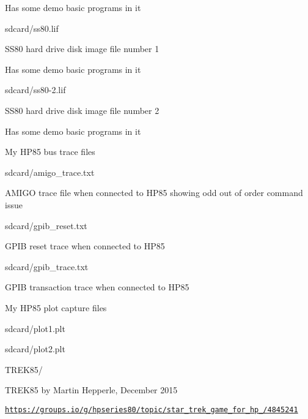 \begin{DoxyItemize}
\begin{DoxyItemize}
\begin{DoxyItemize}
\begin{DoxyItemize}
\item Has some demo basic programs in it
\end{DoxyItemize}
\item sdcard/ss80.\+lif
\begin{DoxyItemize}
\item S\+S80 hard drive disk image file number 1
\item Has some demo basic programs in it
\end{DoxyItemize}
\item sdcard/ss80-\/2.\+lif
\begin{DoxyItemize}
\item S\+S80 hard drive disk image file number 2
\item Has some demo basic programs in it
\end{DoxyItemize}
\end{DoxyItemize}
\item My H\+P85 bus trace files
\begin{DoxyItemize}
\item sdcard/amigo\+\_\+trace.\+txt
\begin{DoxyItemize}
\item A\+M\+I\+GO trace file when connected to H\+P85 showing odd out of order command issue
\end{DoxyItemize}
\item sdcard/gpib\+\_\+reset.\+txt
\begin{DoxyItemize}
\item G\+P\+IB reset trace when connected to H\+P85
\end{DoxyItemize}
\item sdcard/gpib\+\_\+trace.\+txt
\begin{DoxyItemize}
\item G\+P\+IB transaction trace when connected to H\+P85
\end{DoxyItemize}
\end{DoxyItemize}
\item My H\+P85 plot capture files
\begin{DoxyItemize}
\item sdcard/plot1.\+plt
\item sdcard/plot2.\+plt
\end{DoxyItemize}
\item T\+R\+E\+K85/
\begin{DoxyItemize}
\item T\+R\+E\+K85 by Martin Hepperle, December 2015
\item \href{https://groups.io/g/hpseries80/topic/star_trek_game_for_hp_85/4845241}{\tt https\+://groups.\+io/g/hpseries80/topic/star\+\_\+trek\+\_\+game\+\_\+for\+\_\+hp\+\_/4845241}

\end{DoxyItemize}
\end{DoxyItemize}
\end{DoxyItemize}
